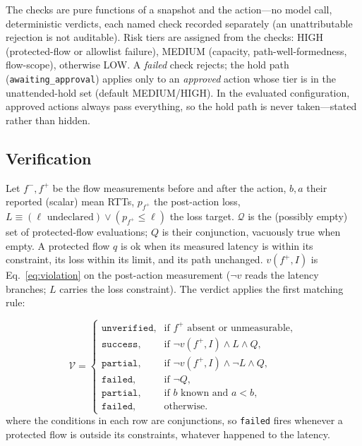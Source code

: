 \documentclass[conference]{IEEEtran}
\begin{document}
The checks are pure functions of a snapshot and the action---no model call,
deterministic verdicts, each named check recorded separately (an
unattributable rejection is not auditable). Risk tiers are assigned from
the checks: HIGH (protected-flow or allowlist failure), MEDIUM (capacity,
path-well-formedness, flow-scope), otherwise LOW. A \emph{failed} check
rejects; the hold path (\texttt{awaiting\_approval}) applies only to an
\emph{approved} action whose tier is in the unattended-hold set (default
MEDIUM/HIGH). In the evaluated configuration, approved actions always pass
everything, so the hold path is never taken---stated rather than hidden.

\subsection{Verification}

Let $f^-,f^+$ be the flow measurements before and after the action,
$b,a$ their reported (scalar) mean RTTs, $p_{f^+}$ the post-action loss,
$L\equiv(\ell\text{ undeclared})\vee(p_{f^+}\le\ell)$ the loss target.
$\mathcal{Q}$ is the (possibly empty) set of protected-flow evaluations;
$Q$ is their conjunction, vacuously true when empty. A protected flow $q$
is ok when its measured latency is within its constraint, its loss within
its limit, and its path unchanged. $v(f^+,I)$ is Eq.~\eqref{eq:violation}
on the post-action measurement ($\neg v$ reads the latency branches; $L$
carries the loss constraint). The verdict applies the first matching rule:

\begin{equation}
\mathcal{V}=
\begin{cases}
\texttt{unverified}, & \text{if } f^+ \text{ absent or unmeasurable},\\[2pt]
\texttt{success},    & \text{if } \neg v(f^+,I) \wedge L \wedge Q,\\[2pt]
\texttt{partial},    & \text{if } \neg v(f^+,I) \wedge \neg L \wedge Q,\\[2pt]
\texttt{failed},     & \text{if } \neg Q,\\[2pt]
\texttt{partial},    & \text{if } b \text{ known and } a < b,\\[2pt]
\texttt{failed},     & \text{otherwise}.
\end{cases}
\label{eq:verify}
\end{equation}
where the conditions in each row are conjunctions, so \texttt{failed} fires
whenever a protected flow is outside its constraints, whatever happened to
the latency.
\end{document}
